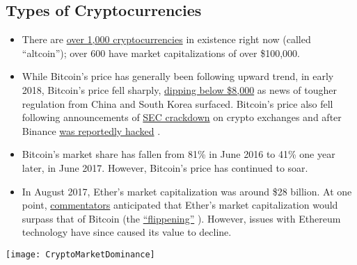 	\subsection{Types of Cryptocurrencies}
		\begin{itemize}
			\item There are \href{https://coinmarketcap.com/all/views/all/}{over 1,000 cryptocurrencies} \cite{coinmarketcapAll} 
			in existence right now (called ``altcoin''); 
			over 600 have market capitalizations of over \$100,000.
			\item While Bitcoin’s price has generally been following upward trend, in early 2018, Bitcoin’s price fell sharply, 
			\href{https://www.cnbc.com/2018/02/05/bitcoin-price-drops-below-8000-over-60-billion-wiped-off-cryptocurrencies.html}{dipping below \$8,000} 
			\cite{cnbcBitcoinPriceSurge}
			as news of tougher regulation from China and South Korea surfaced. Bitcoin's price also fell 
			following announcements of \href{http://www.latimes.com/business/la-fi-bitcoin-sec-registration-20180307-story.html}{SEC crackdown} 
			\cite{laTimes}
			on crypto exchanges and after Binance 
			\href{https://www.ft.com/content/58a32050-22aa-11e8-add1-0e8958b189ea}{was reportedly hacked}
			\cite{ftBinanceHack}.
			\item Bitcoin’s market share has fallen from 81\% in June 2016 to 41\% one year later, in June 2017. 
			However, Bitcoin’s price has continued to soar.
			\item In August 2017, Ether’s market capitalization was around \$28 billion. At one point, 
			\href{http://www.zerohedge.com/news/2017-05-31/ethereum-forecast-surpass-bitcoin-2018}{commentators} \cite{zeroHedge}
			anticipated that Ether’s market 
			capitalization would surpass that of Bitcoin (the 
			\href{https://www.flippening.watch/}{``flippening''} \cite{flippening}). 
			However, issues with Ethereum technology have since caused its value to decline.
		\end{itemize}
		\begin{center}
			\texttt{[image: CryptoMarketDominance]}
		\end{center}

